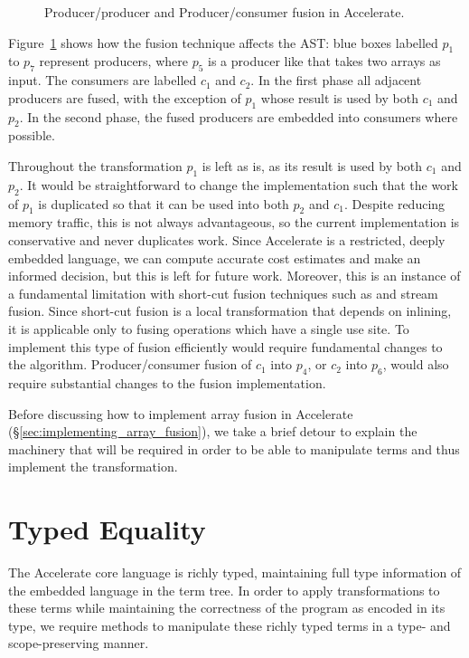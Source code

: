 \begin{figure}[htb]
    \caption[Fusion in Accelerate]{Producer/producer and Producer/consumer fusion in Accelerate.}
    \label{fig:fusion}
\end{figure}

Figure~\ref{fig:fusion} shows how the fusion technique affects the
AST: blue boxes labelled $p_1$ to $p_7$ represent
producers, where $p_5$ is a producer like  that takes two arrays
as input. The consumers are labelled $c_1$ and $c_2$. In the first phase all
adjacent producers are fused, with the exception of $p_1$ whose result is used
by both $c_1$ and $p_2$. In the second phase, the fused producers are embedded
into consumers where possible.

Throughout the transformation $p_1$ is left as is, as its result is used by both
$c_1$ and $p_2$. It would be straightforward to change the implementation such
that the work of $p_1$ is duplicated so that it can be used into both $p_2$ and
$c_1$. Despite reducing memory traffic, this is not always advantageous, so the
current implementation is conservative and never duplicates work. Since
Accelerate is a restricted, deeply embedded language, we can compute accurate
cost estimates and make an informed decision, but this is left for future work.
Moreover, this is an instance of a fundamental limitation with
short-cut fusion techniques such as
 and stream
fusion. Since short-cut fusion is a local transformation that depends on
inlining, it is applicable only to fusing operations which have a single use
site. To implement this type of fusion efficiently would require fundamental
changes to the algorithm.
%
Producer/consumer fusion of $c_1$ into $p_4$, or $c_2$ into $p_6$, would also
require substantial changes to the fusion implementation.

Before discussing how to implement array fusion in Accelerate
(\S\ref{sec:implementing_array_fusion}), we take a brief detour to explain the
machinery that will be required in order to be able to manipulate terms and thus
implement the transformation.


\section{Typed Equality}
\label{sec:equality}

The Accelerate core language is richly typed, maintaining full type information
of the embedded language in the term tree. In order to apply transformations to
these terms while maintaining the correctness of the program as encoded in its
type, we require methods to manipulate these richly typed terms in a type- and
scope-preserving manner.

